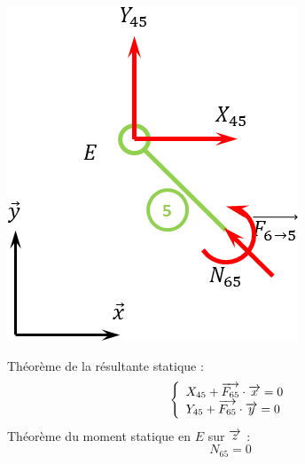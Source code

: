 \documentclass[10pt]{article}
\begin{document}
\begin{exemple}
\begin{minipage}[c]{.25\linewidth}
\begin{center}
\includegraphics[width=.9\textwidth]{images/5}
\end{center}
\end{minipage}\hfill
\begin{minipage}[c]{.7\linewidth}
Théorème de la résultante statique : 
$$
\left\{
\begin{array}{l}
X_{45}+\overrightarrow{F_{65}}\cdot\overrightarrow{x}=0 \\
Y_{45}+\overrightarrow{F_{65}}\cdot\overrightarrow{y}=0 
\end{array}
\right.
$$
Théorème du moment statique en $E$ sur $\overrightarrow{z}$ : 
$$
N_{65}=0 
$$
\end{minipage}
\end{exemple}
\end{document}

